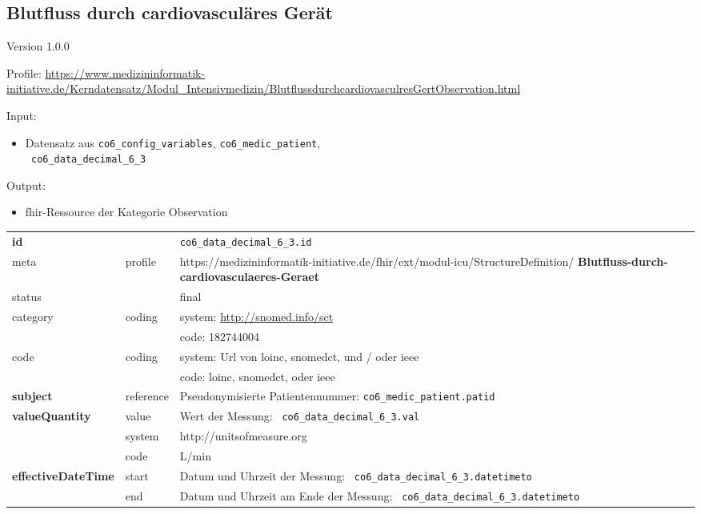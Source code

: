 \subsection{Blutfluss durch cardiovasculäres Gerät} 
\noindent Version 1.0.0

\noindent Profile: \url{https://www.medizininformatik-initiative.de/Kerndatensatz/Modul_Intensivmedizin/BlutflussdurchcardiovasculresGertObservation.html}

\noindent Input:
\begin{itemize}
	\item Datensatz aus \texttt{co6\_config\_variables}, \texttt{co6\_medic\_patient}, \\ \texttt{
co6\_data\_decimal\_6\_3}
\end{itemize}
Output:
\begin{itemize}
        \item \ac{fhir}-Ressource der Kategorie \glqq Observation\grqq{}
\end{itemize}
\begin{longtable}{|l|l|p{7.5cm}|}
        \hline
        \rowcolor{lightgray} \multicolumn{3}{|l|}{Data Mapping (inhaltlich)} \\ \hline
        \textbf{id} &  & \texttt{co6\_data\_decimal\_6\_3.id} \\ \hline
	meta & profile & https://medizininformatik-initiative.de/fhir/ext/modul-icu/StructureDefinition/\textbf{
Blutfluss-durch-cardiovasculaeres-Geraet} \\ \hline 
	status &  & final   \\ \hline 
	category & coding & system: \url{http://snomed.info/sct} \\
\cline{3-3}
	& & code: 182744004 \\ \hline
	code & coding & system: Url von \ac{loinc}, \ac{snomedct}, und / oder \ac{ieee} \\ 
	\cline{3-3} 
	 &  & code: \ac{loinc}, \ac{snomedct}, oder \ac{ieee} \\ \hline
	 \textbf{subject}  & reference & Pseudonymisierte Patientennummer: \texttt{co6\_medic\_patient.patid} \\ \hline
	 \textbf{valueQuantity}  & value & Wert der Messung: \texttt{
co6\_data\_decimal\_6\_3.val} \\
        \cline{2-3}
         & system & http://unitsofmeasure.org \\
         \cline{2-3}
         & code & L/min
\\ \hline
     \textbf{effectiveDateTime}  & start & Datum und Uhrzeit der Messung: \texttt{
co6\_data\_decimal\_6\_3.datetimeto} \\
    \cline{2-3}
     & end & Datum und Uhrzeit am Ende der Messung: \texttt{
co6\_data\_decimal\_6\_3.datetimeto} \\ \hline
\end{longtable}


